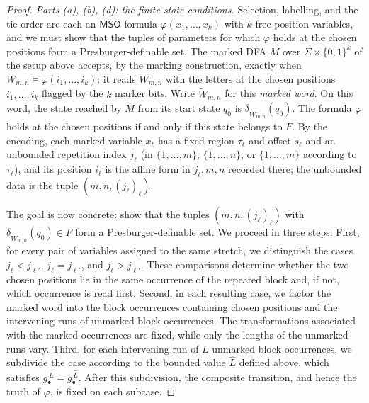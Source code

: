 \documentclass[11pt]{article}
\theoremstyle{definition}
\newcommand{\MSO}{\mathsf{MSO}}
\begin{document}
\begin{proof}
\vspace{0.5em}
\noindent\emph{Parts (a), (b), (d): the finite-state conditions.}
Selection, labelling, and the tie-order are each an $\MSO$ formula
$\varphi(x_1,\ldots,x_k)$ with $k$ free position variables, and we must show that
the tuples of parameters for which $\varphi$ holds at the chosen positions form a
Presburger-definable set.  The marked DFA $M$ over $\Sigma\times\{0,1\}^k$ of the setup
above accepts, by the marking construction, exactly when
$W_{m,n}\models\varphi(i_1,\ldots,i_k)$: it reads $W_{m,n}$ with the letters at
the chosen positions $i_1,\ldots,i_k$ flagged by the $k$ marker bits.  Write
$\widetilde W_{m,n}$ for this \emph{marked word}.  On this word, the state
reached by $M$ from its start state $q_0$ is
$\delta_{\widetilde W_{m,n}}(q_0)$.  The formula $\varphi$ holds at the chosen
positions if and only if this state belongs to $F$.  By the encoding, each marked
variable $x_\ell$ has a fixed region $\tau_\ell$ and offset $s_\ell$ and an
unbounded repetition index $j_\ell$ (in $\{1,\ldots,m\}$, $\{1,\ldots,n\}$, or
$\{1,\ldots,m\}$ according to $\tau_\ell$), and its position $i_\ell$ is the
affine form in $j_\ell,m,n$ recorded there; the unbounded data is the tuple
$(m,n,(j_\ell)_\ell)$.

The goal is now concrete: show that the tuples $(m,n,(j_\ell)_\ell)$ with
$\delta_{\widetilde W_{m,n}}(q_0)\in F$ form a Presburger-definable set.  We
proceed in three steps.  First, for every pair of variables assigned to the same
stretch, we distinguish the cases $j_\ell<j_{\ell'}$,
$j_\ell=j_{\ell'}$, and $j_\ell>j_{\ell'}$.  These comparisons determine
whether the two chosen positions lie in the same occurrence of the repeated
block and, if not, which occurrence is read first.  Second, in each resulting
case, we factor the marked word into the block occurrences containing chosen
positions and the intervening runs of unmarked block occurrences.  The
transformations associated with the marked occurrences are fixed, while only
the lengths of the unmarked runs vary.  Third, for each intervening run of $L$
unmarked block occurrences, we subdivide the case according to the bounded
value $\widehat L$ defined above, which satisfies
$g_\bullet^{\,L}=g_\bullet^{\,\widehat L}$.  After this subdivision, the
composite transition, and hence the truth of $\varphi$, is fixed on each
subcase.


\end{proof}
\end{document}
